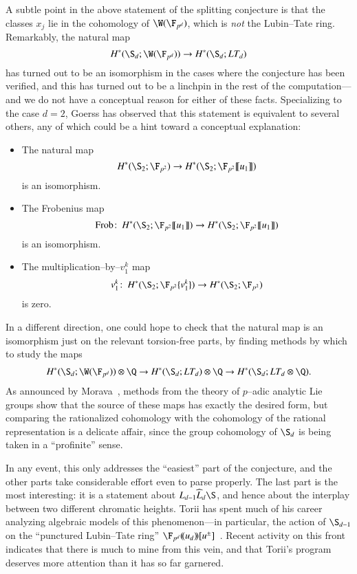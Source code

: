 A subtle point in the above statement of the splitting conjecture is that the classes $x_j$ lie in the cohomology of $\W(\F_{p^d})$, which is \emph{not} the Lubin--Tate ring.  Remarkably, the natural map \[H^*(\S_d; \W(\F_{p^d})) \to H^*(\S_d; LT_d)\] has turned out to be an isomorphism in the cases where the conjecture has been verified, and this has turned out to be a linchpin in the rest of the computation---and we do not have a conceptual reason for either of these facts.  Specializing to the case $d = 2$, Goerss has observed that this statement is equivalent to several others, any of which could be a hint toward a conceptual explanation:
\begin{itemize}
    \item The natural map \[H^*(\S_2; \F_{p^2}) \to H^*(\S_2; \F_{p^2}\ps{u_1})\] is an isomorphism.
    \item The Frobenius map \[\Frob\co H^*(\S_2; \F_{p^2}\ps{u_1}) \to H^*(\S_2; \F_{p^2}\ps{u_1})\] is an isomorphism.
    \item The multiplication--by--$v_1^k$ map \[v_1^k\co H^*(\S_2; \F_{p^2}\{v_1^k\}) \to H^*(\S_2; \F_{p^2})\] is zero.
\end{itemize}
In a different direction, one could hope to check that the natural map is an isomorphism just on the relevant torsion-free parts, by finding methods by which to study the maps
\begin{align*}
H^*(\S_d; \W(\F_{p^d})) \otimes \Q \to H^*(\S_d; LT_d) \otimes \Q \to H^*(\S_d; LT_d \otimes \Q).
\end{align*}
As announced by Morava~\cite[Remark 2.2.5]{MoravaCobordismComodules}, methods from the theory of $p$--adic analytic Lie groups show that the source of these maps has exactly the desired form, but comparing the rationalized cohomology with the cohomology of the rational representation is a delicate affair, since the group cohomology of $\S_d$ is being taken in a ``profinite'' sense.

In any event, this only addresses the ``easiest'' part of the conjecture, and the other parts take considerable effort even to parse properly.  The last part is the most interesting: it is a statement about $L_{d-1} \widehat L_d \S$, and hence about the interplay between two different chromatic heights.  Torii has spent much of his career analyzing algebraic models of this phenomenon---in particular, the action of $\S_{d-1}$ on the ``punctured Lubin--Tate ring'' $\F_{p^d}(\!(u_d)\!)[u^\pm]$~\cite{Torii1,Torii2,Torii4,Torii3,Torii5}.  Recent activity on this front indicates that there is much to mine from this vein, and that Torii's program deserves more attention than it has so far garnered.

